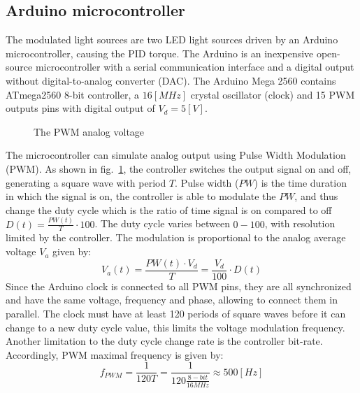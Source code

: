 \documentclass[\main/master.tex]{subfiles}
\begin{document}
\subsection{Arduino microcontroller}
The modulated light sources are two LED light sources driven by an Arduino microcontroller, causing the PID torque. The Arduino is an inexpensive open-source microcontroller with a serial communication interface and a digital output without digital-to-analog converter (DAC). The Arduino Mega 2560 contains ATmega2560 8-bit controller, a $16 [MHz]$ crystal oscillator (clock) and 15 PWM outputs pins with digital output of $V_d = 5[V]$.
\begin{figure}[htbp]
	\centering
	\caption[The PWM analog voltage]{The PWM analog voltage}
	\label{fig:duty_cycle}
\end{figure}
\FloatBarrier
\par\noindent
The microcontroller can simulate analog output using Pulse Width Modulation (PWM). As shown in fig.~\ref{fig:duty_cycle}, the controller switches the output signal on and off, generating a square wave with period $T$. Pulse width ($PW$) is the time duration in which the signal is on, the controller is able to modulate the $PW$, and thus change the duty cycle which is the ratio of time signal is on compared to off $D(t) = \frac{PW(t)}{T}\cdot 100$. The duty cycle varies between $0-100$, with resolution limited by the controller. The modulation is proportional to the analog average voltage $V_a$ given by: 
\begin{equation}
V_a(t) = \frac{ PW(t)\cdot V_d}{ T}  = \frac{V_d}{100}\cdot D(t)   \label{eqn:pwm voltage}
\end{equation}
Since the Arduino clock is connected to all PWM pins, they are all synchronized and have the same voltage, frequency and phase, allowing to connect them in parallel. The clock must have at least 120 periods of square waves before it can change to a new duty cycle value, this limits the voltage modulation frequency. Another limitation to the duty cycle change rate is the controller bit-rate. Accordingly, PWM maximal frequency is given by:
\begin{equation}
f_{PWM} = \frac{1 }{120T}= \frac{1 }{120 \frac{8-bit }{16MHz}}  \approx 500[Hz]	    \label{eqn:pwm frequency}
\end{equation}
\end{document}
